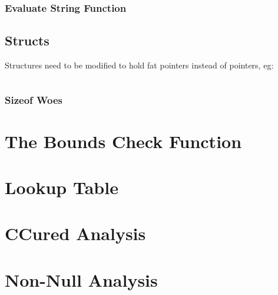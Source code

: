 \subsubsection{Evaluate String Function}

\subsection{Structs}

Structures need to be modified to hold fat pointers instead of pointers, eg:

\begin{verbatim}

\end{verbatim}
	
\subsubsection{Sizeof Woes}

\section{The Bounds Check Function}

\section{Lookup Table}

\section{CCured Analysis}

\section{Non-Null Analysis}
